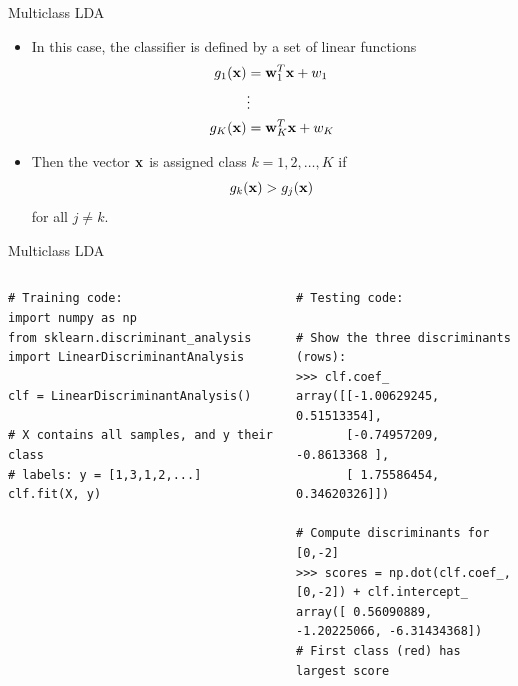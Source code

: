 \documentclass[10pt, aspectratio=169]{beamer} %
\newcommand{\w}{{\bf w}}
\newcommand{\x}{{\bf x}}
\begin{document}
\begin{frame}[fragile,allowframebreaks=0.8]{Multiclass LDA}
\begin{itemize}
\item In this case,
the classifier is defined by a set of linear functions
\begin{align*}
g_1(\x) &= \w_1^T\x + w_1\\
&\vdots \\
g_K(\x) &= \w_K^T\x + w_K\\
\end{align*}
\item Then the vector $\x$ is assigned class $k = 1,2,\ldots, K$ if
\[
g_k(\x) > g_j(\x)
\]
for all $j\ne k$.
\end{itemize}
\end{frame}

\begin{frame}[fragile,allowframebreaks=0.8]
 {Multiclass LDA}
\begin{columns}[onlytextwidth]
\begin{lstlisting}
# Training code:
import numpy as np
from sklearn.discriminant_analysis import LinearDiscriminantAnalysis

clf = LinearDiscriminantAnalysis()

# X contains all samples, and y their class
# labels: y = [1,3,1,2,...]
clf.fit(X, y)
\end{lstlisting}
\begin{lstlisting}
# Testing code:

# Show the three discriminants (rows):
>>> clf.coef_
array([[-1.00629245,  0.51513354], 
       [-0.74957209, -0.8613368 ], 
       [ 1.75586454,  0.34620326]])

# Compute discriminants for [0,-2]
>>> scores = np.dot(clf.coef_, [0,-2]) + clf.intercept_
array([ 0.56090889, -1.20225066, -6.31434368])
# First class (red) has largest score


\end{lstlisting}
\end{columns}
\end{frame}
\end{document}
